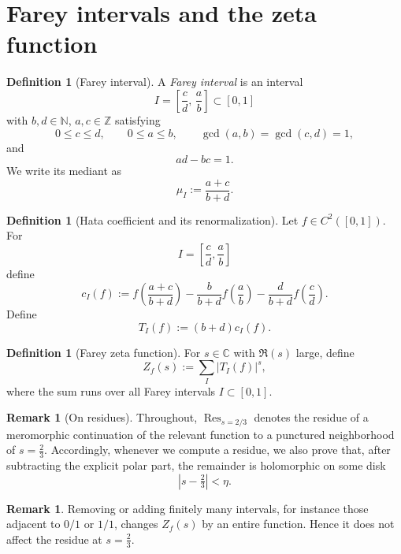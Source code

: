 \documentclass[a4paper,american,11pt]{amsart}
\theoremstyle{plain}
\theoremstyle{definition}
\newtheorem{definition}[theorem]{Definition}
\newtheorem{remark}[theorem]{Remark}
\newcommand{\N}{\mathbb N}
\newcommand{\Z}{\mathbb Z}
\newcommand{\C}{\mathbb C}
\DeclareMathOperator*{\Res}{Res}
\begin{document}
\section{Farey intervals and the zeta function}\label{sec3}

\begin{definition}[Farey interval]
A \emph{Farey interval} is an interval
\[
I=\left[\frac cd,\,\frac ab\right]\subset[0,1]
\]
with \(b,d\in\N\), \(a,c\in\Z\) satisfying
\[
0\le c\le d,\qquad 0\le a\le b,\qquad
\gcd(a,b)=\gcd(c,d)=1,
\]
and
\[
ad-bc=1.
\]
We write its mediant as
\[
\mu_I:=\frac{a+c}{b+d}.
\]
\end{definition}

\begin{definition}[Hata coefficient and its renormalization]
Let \(f\in C^2([0,1])\). For
\[
I=\left[\frac cd,\frac ab\right]
\]
define
\begin{equation}\label{coeff_hata}
c_I(f)
:=
f\!\left(\frac{a+c}{b+d}\right)
-\frac{b}{b+d}f\!\left(\frac ab\right)
-\frac{d}{b+d}f\!\left(\frac cd\right).
\end{equation}
Define
\[
T_I(f):=(b+d)c_I(f).
\]
\end{definition}

\begin{definition}[Farey zeta function]\label{def:Fareyzeta}
For \(s\in\C\) with \(\Re(s)\) large, define
\[
Z_f(s):=\sum_I |T_I(f)|^s,
\]
where the sum runs over all Farey intervals \(I\subset[0,1]\).
\end{definition}

\begin{remark}[On residues]
\label{rem:residue}
Throughout, \(\Res_{s=2/3}\) denotes the residue of a meromorphic
continuation of the relevant function to a punctured neighborhood of
\(s=\frac23\). Accordingly, whenever we compute a residue, we also prove
that, after subtracting the explicit polar part, the remainder is holomorphic
on some disk
\[
|s-\tfrac23|<\eta.
\]
\end{remark}

\begin{remark}
Removing or adding finitely many intervals, for instance those adjacent to
\(0/1\) or \(1/1\), changes \(Z_f(s)\) by an entire function. Hence it does
not affect the residue at \(s=\frac23\).
\end{remark}
\end{document}
